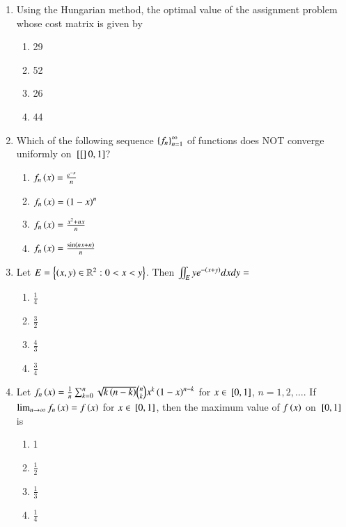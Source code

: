 \documentclass[journal,12pt,onecolumn]{IEEEtran}
\theoremstyle{remark}
\begin{document}
\begin{enumerate}
	\item Using the Hungarian method, the optimal value of the assignment problem whose cost matrix is given by 
		\begin{table}[ht]
		\centering
		
		\end{table}
	\begin{multicols}{4}
	\begin{enumerate}
		\item 29
		\item 52
		\item 26
		\item 44
	\end{enumerate}
	\end{multicols}

	\item Which of the following sequence $\left\{f_{n}\right\}_{n=1}^{\infty}$ of functions does NOT converge uniformly on ${}\left[[\right]0,1]$?
	\begin{multicols}{2}
	\begin{enumerate}
		\item $f_{n}\left(x\right)=\frac{e^{-x}}{n}$
		\item $f_{n}\left(x\right)=\left(1-x\right)^{n}$
		\item $f_{n}\left(x\right)=\frac{x^{2}+nx}{n}$
		\item $f_{n}\left(x\right)=\frac{\sin\left(nx+n\right)}{n}$
	\end{enumerate}
	\end{multicols}

	\item Let $E=\left\{\left(x,y\right)\in \mathbb{R}^{2} : 0<x<y\right\}$. Then $\iint_{E} ye^{-\left(x+y\right)}dxdy=$
	\begin{multicols}{2}
	\begin{enumerate}
		\item $\frac{1}{4}$
		\item $\frac{3}{2}$
		\item $\frac{4}{3}$
		\item $\frac{3}{4}$
	\end{enumerate}
	\end{multicols}

	\item Let $f_{n}\left(x\right)=\frac{1}{n} \sum _{k=0}^{n} \sqrt{k\left(n-k\right)} \binom{n}{k} x^{k} \left(1-x\right)^{n-k}$ for $x\in {}\left[0,1\right]$, $n=1, 2, \dots$. If $\lim _{n\to \infty} f_{n}\left(x\right)=f\left(x\right)$ for $x\in {}\left[0,1\right]$, then the maximum value of $f\left(x\right)$ on ${}\left[0,1\right]$ is
	\begin{multicols}{4}
	\begin{enumerate}
		\item 1
		\item $\frac{1}{2}$
		\item $\frac{1}{3}$
		\item $\frac{1}{4}$
	\end{enumerate}
	\end{multicols}


\end{enumerate}
\end{document}
